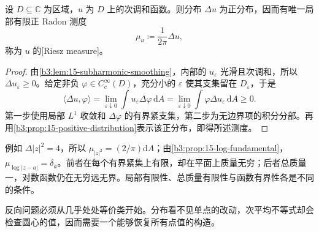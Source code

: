 \begin{proposition}\label{b3:prop:15-riesz-measure}
设 \(D\subseteq\mathbb C\) 为区域，\(u\) 为 \(D\) 上的次调和函数。则分布 \(\Delta u\) 为正分布，因而有唯一局部有限正 Radon 测度
\[
 \mu_u\coloneqq\frac1{2\pi}\Delta u,
\]
称为 \(u\) 的[Riesz measure]。
\end{proposition}
\begin{proof}
由\cref{b3:lem:15-subharmonic-smoothing}，内部的 \(u_\varepsilon\) 光滑且次调和，所以 \(\Delta u_\varepsilon\ge0\)。给定非负 \(\varphi\in C_c^\infty(D)\)，充分小的 \(\varepsilon\) 使其支集留在 \(D_\varepsilon\)，于是
\[
 \langle\Delta u,\varphi\rangle
 =\lim_{\varepsilon\downarrow0}\int u_\varepsilon\Delta\varphi\,\mathrm{d}A
 =\lim_{\varepsilon\downarrow0}\int\varphi\Delta u_\varepsilon\,\mathrm{d}A\ge0.
\]
第一步使用局部 \(L^1\) 收敛和 \(\Delta\varphi\) 的有界紧支集，第二步为无边界项的积分分部。再用\cref{b3:prop:15-positive-distribution}表示该正分布，即得所述测度。
\end{proof}

例如 \(\Delta|z|^2=4\)，所以 \(\mu_{|z|^2}=(2/\pi)\mathrm{d}A\)；由\cref{b3:prop:15-log-fundamental}，\(\mu_{\log|z-a|}=\delta_a\)。前者在每个有界紧集上有限，却在平面上质量无穷；后者总质量一，对数函数仍在无穷远无界。局部有限性、总质量有限性与函数有界性各是不同的条件。

\ProseParagraphBreak

反向问题必须从几乎处处等价类开始。分布看不见单点的改动，次平均不等式却会检查圆心的值，因而需要一个能够恢复所有点值的构造。


